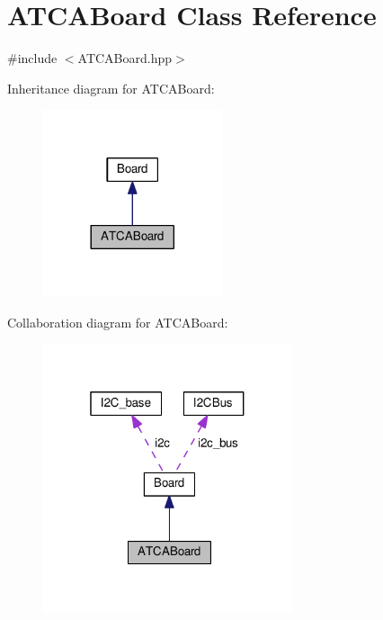 \hypertarget{class_a_t_c_a_board}{}\section{A\+T\+C\+A\+Board Class Reference}
\label{class_a_t_c_a_board}


{\ttfamily \#include $<$A\+T\+C\+A\+Board.\+hpp$>$}



Inheritance diagram for A\+T\+C\+A\+Board\+:\nopagebreak
\begin{figure}[H]
\begin{center}
\leavevmode
\includegraphics[width=149pt]{class_a_t_c_a_board__inherit__graph}
\end{center}
\end{figure}


Collaboration diagram for A\+T\+C\+A\+Board\+:\nopagebreak
\begin{figure}[H]
\begin{center}
\leavevmode
\includegraphics[width=208pt]{class_a_t_c_a_board__coll__graph}
\end{center}
\end{figure}
